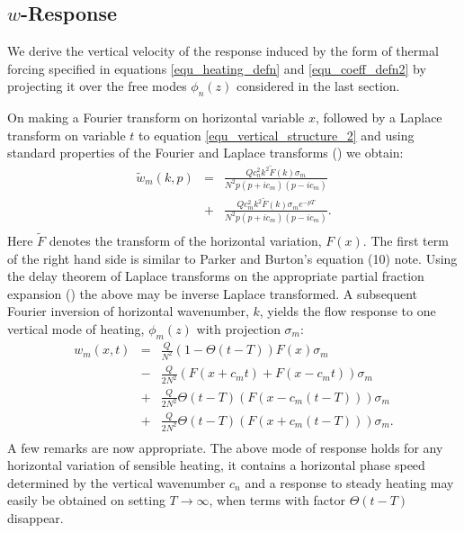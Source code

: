 \documentclass[a4paper,10pt]{article}
\newcommand{\heavi}{\Theta}
\begin{document}
\subsection{$w$-Response}
%
We derive the vertical velocity of the response induced by the form of thermal forcing specified in equations \ref{equ_heating_defn}
and \ref{equ_coeff_defn2} by projecting it over the free modes $\phi_n(z)$ considered in the last section. 

On making a Fourier transform on horizontal variable $x$, followed by a Laplace transform 
on variable $t$ to equation \ref{equ_vertical_structure_2} and using standard properties of the Fourier and Laplace transforms 
 (\citep{arfken2013mathematical}) we obtain:
%
\begin{eqnarray}
\tilde{w}_m(k,p) & = & \frac{Q c_n^2 k^2 \tilde{F}(k) \sigma_m }{ N^2 p \left( p + i c_m \right) \left( p-i c_m \right)  } \\ \nonumber
                        & + &  \frac{Q c_m^2 k^2 \tilde{F}(k)  \sigma_m e^{-pT} }{ N^2 p \left( p + i c_m \right) \left( p-i c_m \right)  }. \\ \nonumber
\end{eqnarray}
%
Here $ \tilde{F}$ denotes the transform of the horizontal variation, $F(x)$. 
The first term of the right hand side is similar to Parker and Burton's equation (10) note.
Using the delay theorem of Laplace transforms on the appropriate partial fraction expansion (\citep{arfken2013mathematical})
the above may be inverse Laplace transformed. A subsequent Fourier inversion of horizontal wavenumber, $k$, yields
the flow response to one vertical mode of heating, $\phi_m(z)$ with projection $\sigma_m$:
%
\begin{eqnarray}
\label{equ_PB2}
w_m(x,t) & = & \frac{Q}{N^2} \left( 1 - \heavi( t-T) \right) F(x) \sigma_m \\ \nonumber
              & - & \frac{Q}{2N^2} \left(  F(x + c_m t) + F(x - c_m t) \right) \sigma_m\\ \nonumber
              & + & \frac{Q}{2 N^2} \heavi( t-T) \left( F(x-c_m (t-T)) \right) \sigma_m \\ \nonumber
              & + & \frac{Q}{2 N^2} \heavi( t-T) \left( F(x+ c_m (t-T))  \right) \sigma_m. \\ \nonumber
\end{eqnarray}
% 
A few remarks are now appropriate. The above mode of response holds for any horizontal variation of sensible heating, it 
contains a horizontal phase speed determined by the vertical wavenumber $c_n$ and a response to steady heating may 
easily be obtained on setting $T \rightarrow \infty$, when terms with factor $\heavi(t-T)$ disappear. 
\end{document}
